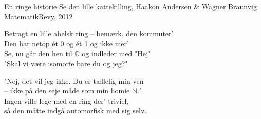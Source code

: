 \begin{song}{En ringe historie}
  {} %
  {Se den lille kattekilling, Haakon Andersen \& Wagner Braunvig} %
  {} %
  {MatematikRevy, 2012} %
  {\NotCCLIed} %

  \begin{SBVerse}
    Betragt en lille abelsk ring -- bemærk, den kommuter'\\
    Den har netop ét 0 og ét 1 og ikke mer'\\
    Se, nu går den hen til $\mathbb{C}$ og indleder med "Hej"\\
    "Skal vi være isomorfe bare du og jeg?"
  \end{SBVerse}

  \begin{SBVerse}
    "Nej, det vil jeg ikke. Du er tællelig min ven\\
    -- ikke på den seje måde som min homie $\mathbb{N}$."\\
    Ingen ville lege med en ring der' triviel,\\
    så den måtte indgå automorfisk med sig selv.
  \end{SBVerse}
\end{song}
